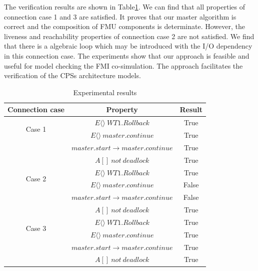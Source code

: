 The verification results are shown in Table\ref{rs}. We can find that all properties of connection case 1 and 3 are satisfied. It proves that our master algorithm is correct and the composition of FMU components is determinate. However, the liveness and reachability properties of connection case 2 are not satisfied. We find that there is a algebraic loop which may be introduced with the I/O dependency in this connection case. The experiments show that our approach is feasible and useful for model checking the FMI co-simulation. The approach facilitates the verification of the CPSs architecture models.
\begin{table}
\caption{Experimental results}
\centering
\begin{tabular}{c c c} 
        \hline  
        Connection case & Property & Result\\
        \hline
        \multirow{2}{2.0cm}{Case 1}  
                & $E\langle\rangle~WT1.Rollback$ & True\\ 
                & $E\langle\rangle~master.continue$ & True\\ 
                & $master.start\rightarrow master.continue$ & True\\ 
                & $A[]~not~deadlock$ & True\\   
        \hline 
        \multirow{2}{2.0cm}{Case 2}  
                & $E\langle\rangle~WT1.Rollback$ & True\\ 
                & $E\langle\rangle~master.continue$ & False\\ 
                & $master.start\rightarrow master.continue$ & False\\ 
                & $A[]~not~deadlock$ & True\\   
        \hline 
        \multirow{2}{2.0cm}{Case 3}  
                & $E\langle\rangle~WT1.Rollback$ & True\\ 
                & $E\langle\rangle~master.continue$ & True\\ 
                & $master.start \rightarrow master.continue$ & True\\ 
                & $A[]~not~deadlock$ & True\\   
        \hline 
\end{tabular} 
\label{rs}
\end{table}




